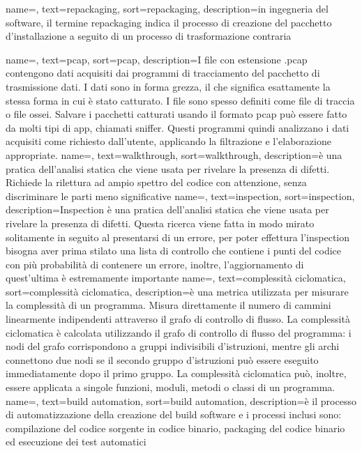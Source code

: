 


{
name=,
text=repackaging,
sort=repackaging,
description={in ingegneria del software, il termine repackaging indica il processo di creazione del pacchetto d'installazione a seguito di un processo di trasformazione contraria}
}

{
name=,
text=pcap,
sort=pcap,
description={I file con estensione .pcap contengono dati acquisiti dai programmi di tracciamento del pacchetto di trasmissione dati.
I dati sono in forma grezza, il che significa esattamente la stessa forma in cui è stato catturato.
I file sono spesso definiti come file di traccia o file ossei.
Salvare i pacchetti catturati usando il formato pcap può essere fatto da molti tipi di app, chiamati sniffer. Questi programmi quindi analizzano i dati acquisiti come richiesto dall'utente, applicando la filtrazione e l'elaborazione appropriate.}
}
{
name=,
text=walkthrough,
sort=walkthrough,
description={è una pratica dell’analisi statica che viene usata per rivelare la presenza di difetti.
Richiede la rilettura ad ampio spettro del codice con attenzione, senza discriminare le parti meno significative}
}
{
name=,
text=inspection,
sort=inspection,
description={Inspection è una pratica dell’analisi statica che viene usata per rivelare la presenza di difetti.
Questa ricerca viene fatta in modo mirato solitamente in seguito al presentarsi di un errore, per poter effettura l'inspection bisogna aver prima stilato una lista di controllo che contiene i punti del codice con più probabilità di contenere un errore, inoltre, l'aggiornamento di quest'ultima è estremamente importante}
}
{
name=,
text=complessità ciclomatica,
sort=complessità ciclomatica,
description={è una metrica utilizzata per misurare la complessità di un programma.
Misura direttamente il numero di cammini linearmente indipendenti attraverso il grafo di controllo di flusso.
La complessità ciclomatica è calcolata utilizzando il grafo di controllo di flusso del programma: i nodi del grafo corrispondono a gruppi indivisibili d'istruzioni, mentre gli archi connettono due nodi se il secondo gruppo d'istruzioni può essere eseguito immediatamente dopo il primo gruppo.
La complessità ciclomatica può, inoltre, essere applicata a singole funzioni, moduli, metodi o classi di un programma.\cite{site:complessita_ciclomatica} }
}
{
name=,
text=build automation,
sort=build automation,
description={è il processo di automatizzazione della creazione del build software e i processi inclusi sono: compilazione del codice sorgente in codice binario, packaging del codice binario ed esecuzione dei test automatici}
}

